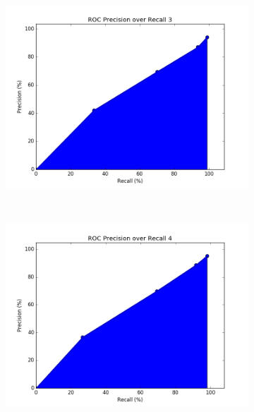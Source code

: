 \documentclass[12pt]{article}
\begin{document}
\begin{figure}[h!]
\ContinuedFloat        
        \begin{subfigure}[t]{0.5\textwidth}
        \centering
        \includegraphics[width=1.\textwidth]{graphs/problem3_ROC3}
        \caption{}
    \end{subfigure}%
    ~ 
    \begin{subfigure}[t]{0.5\textwidth}
        \centering
        \includegraphics[width=1.\textwidth]{graphs/problem3_ROC4}
        \caption{}
    \end{subfigure}%
  

\end{figure}
\end{document}
